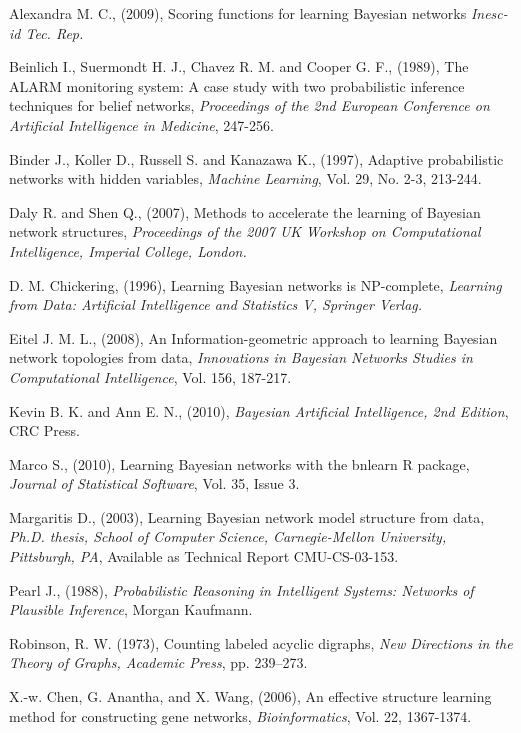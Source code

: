 \documentclass[runningheads,a4paper]{llncs}
\begin{document}
\begin{bibliography}{99}
	\begin{enumerate}
		
		 Alexandra M. C., (2009), Scoring functions for learning Bayesian networks \emph{Inesc-id Tec. Rep.}
		
		 Beinlich I., Suermondt H. J., Chavez R. M. and Cooper G. F., (1989), The ALARM monitoring system: A case study with two probabilistic inference techniques for belief networks, \emph{Proceedings of the 2nd European Conference on Artificial Intelligence in Medicine}, 247-256.
		
		 Binder J., Koller D., Russell S. and Kanazawa K., (1997), Adaptive probabilistic networks with hidden variables, \emph{Machine Learning}, Vol. 29, No. 2-3, 213-244.
		
		 Daly R. and Shen Q., (2007), Methods to accelerate the learning of Bayesian network structures, \emph{Proceedings of the 2007 UK Workshop on Computational Intelligence, Imperial College, London.}
				
		 D. M. Chickering, (1996), Learning Bayesian networks is NP-complete, \emph{Learning from Data: Artificial Intelligence and Statistics V, Springer Verlag.}
		
		 Eitel J. M. L., (2008), An Information-geometric approach to learning Bayesian network topologies from data, \emph{Innovations in Bayesian Networks Studies in Computational Intelligence}, Vol. 156, 187-217.
			
		 Kevin B. K. and Ann E. N., (2010), \emph{Bayesian Artificial Intelligence, 2nd Edition}, CRC Press.
			
		 Marco S., (2010), Learning Bayesian networks with the bnlearn R package, \emph{Journal of Statistical Software}, Vol. 35, Issue 3.
		
		 Margaritis D., (2003), Learning Bayesian network model structure from data, \emph{Ph.D. thesis, School of Computer Science, Carnegie-Mellon University, Pittsburgh, PA}, Available as Technical Report CMU-CS-03-153.
		
		 Pearl J., (1988), \emph{Probabilistic Reasoning in Intelligent Systems: Networks of Plausible Inference}, Morgan Kaufmann.
		
		 Robinson, R. W. (1973), Counting labeled acyclic digraphs, \emph{New Directions in the Theory of Graphs, Academic Press}, pp. 239–273.
		
		 X.-w. Chen, G. Anantha, and X. Wang, (2006), An effective structure learning method for constructing gene networks, \emph{Bioinformatics}, Vol. 22, 1367-1374.
	\end{enumerate}
\end{bibliography}
\end{document}
